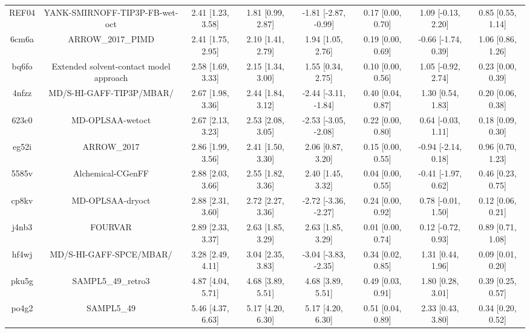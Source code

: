 \documentclass{article}
\begin{document}
\begin{center}
\begin{longtable}{|cccccccc|}
 REF04 &                     YANK-SMIRNOFF-TIP3P-FB-wet-oct &  2.41 [1.23, 3.58] &  1.81 [0.99, 2.87] &  -1.81 [-2.87, -0.99] &  0.17 [0.00, 0.70] &   1.09 [-0.13, 2.20] &     0.85 [0.55, 1.14] \\
 6cm6a &                                  ARROW\_2017\_PIMD &  2.41 [1.75, 2.95] &  2.10 [1.41, 2.79] &     1.94 [1.05, 2.76] &  0.19 [0.00, 0.69] &  -0.66 [-1.74, 0.39] &     1.06 [0.86, 1.26] \\
 bq6fo &            Extended solvent-contact model approach &  2.58 [1.69, 3.33] &  2.15 [1.34, 3.00] &     1.55 [0.34, 2.75] &  0.10 [0.00, 0.56] &   1.05 [-0.92, 2.74] &     0.23 [0.00, 0.39] \\
 4nfzz &                           MD/S-HI-GAFF-TIP3P/MBAR/ &  2.67 [1.98, 3.36] &  2.44 [1.84, 3.12] &  -2.44 [-3.11, -1.84] &  0.40 [0.04, 0.87] &    1.30 [0.54, 1.83] &     0.20 [0.06, 0.38] \\
 623c0 &                                   MD-OPLSAA-wetoct &  2.67 [2.13, 3.23] &  2.53 [2.08, 3.05] &  -2.53 [-3.05, -2.08] &  0.22 [0.00, 0.80] &   0.64 [-0.03, 1.11] &     0.18 [0.09, 0.30] \\
 eg52i &                                        ARROW\_2017 &  2.86 [1.99, 3.56] &  2.41 [1.50, 3.30] &     2.06 [0.87, 3.20] &  0.15 [0.00, 0.55] &  -0.94 [-2.14, 0.18] &     0.96 [0.70, 1.23] \\
 5585v &                                  Alchemical-CGenFF &  2.88 [2.03, 3.66] &  2.55 [1.82, 3.36] &     2.40 [1.45, 3.32] &  0.04 [0.00, 0.55] &  -0.41 [-1.97, 0.62] &     0.46 [0.23, 0.75] \\
 cp8kv &                                   MD-OPLSAA-dryoct &  2.88 [2.31, 3.60] &  2.72 [2.27, 3.36] &  -2.72 [-3.36, -2.27] &  0.24 [0.00, 0.92] &   0.78 [-0.01, 1.50] &     0.12 [0.06, 0.21] \\
 j4nb3 &                                            FOURVAR &  2.89 [2.33, 3.37] &  2.63 [1.85, 3.29] &     2.63 [1.85, 3.29] &  0.01 [0.00, 0.74] &   0.12 [-0.72, 0.93] &     0.89 [0.71, 1.08] \\
 hf4wj &                            MD/S-HI-GAFF-SPCE/MBAR/ &  3.28 [2.49, 4.11] &  3.04 [2.35, 3.83] &  -3.04 [-3.83, -2.35] &  0.34 [0.02, 0.85] &    1.31 [0.44, 1.96] &     0.09 [0.01, 0.20] \\
 pku5g &                                 SAMPL5\_49\_retro3 &  4.87 [4.04, 5.71] &  4.68 [3.89, 5.51] &     4.68 [3.89, 5.51] &  0.49 [0.03, 0.91] &    1.80 [0.28, 3.01] &     0.39 [0.25, 0.57] \\
 po4g2 &                                         SAMPL5\_49 &  5.46 [4.37, 6.63] &  5.17 [4.20, 6.30] &     5.17 [4.20, 6.30] &  0.51 [0.04, 0.89] &    2.33 [0.43, 3.80] &     0.34 [0.20, 0.52] \\
\end{longtable}
\end{center}
\end{document}
